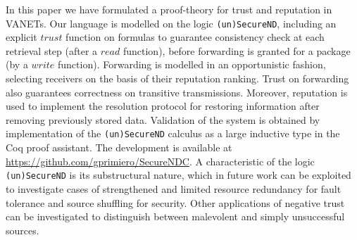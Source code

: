 \documentclass[compsoc, conference, letterpaper, 10pt, times]{IEEEtran}
\begin{document}
In this paper we have formulated a proof-theory for trust and reputation in VANETs. Our language is modelled on the logic \texttt{(un)SecureND}, including an explicit $trust$ function on formulas to guarantee consistency check at each retrieval step (after a $read$ function), before forwarding is granted for a package (by a $write$ function). Forwarding is modelled in an opportunistic fashion, selecting receivers on the basis of their reputation ranking. Trust on forwarding also guarantees correctness on transitive transmissions. Moreover, reputation is used to implement the resolution protocol for restoring information after removing previously stored data.
Validation of the system is obtained by implementation of the \texttt{(un)SecureND} calculus as a large inductive type in the Coq proof assistant. The development is available at \url{https://github.com/gprimiero/SecureNDC}. 
A characteristic of the logic \texttt{(un)SecureND} is its substructural nature, which in future work can be exploited to investigate cases of strengthened and limited resource redundancy for fault tolerance and source shuffling for security. Other applications of negative trust can be investigated to distinguish between malevolent and simply unsuccessful sources.




\end{document}
